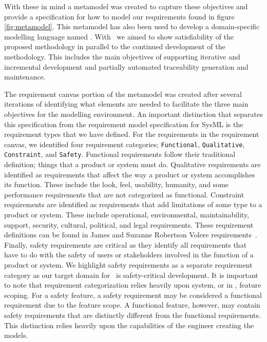 With these in mind a metamodel was created to capture these objectives and provide a specification for how to model our requirements found in figure \ref{fig:metamodel}. This metamodel has also been used to develop a domain-specific modelling language named \tool. With \tool\ we aimed to show satisfiability of the proposed methodology in parallel to the continued development of the methodology. This includes the main objectives of supporting iterative and incremental development and partially automated traceability generation and maintenance.

The requirement canvas portion of the metamodel was created after several iterations of identifying what elements are needed to facilitate the three main objectives for the modelling environment. An important distinction that separates this specification from the requirement model specification for SysML is the requirement types that we have defined. For the requirements in the requirement canvas, we identified four requirement categories; \texttt{Functional}, \texttt{Qualitative}, \texttt{Constraint}, and \texttt{Safety}. Functional requirements follow their traditional definition; things that a product or system must do. Qualitative requirements are identified as requirements that affect the way a product or system accomplishes its function. These include the look, feel, usability, humanity, and some performance requirements that are not categorized as functional. Constraint requirements are identified as requirements that add limitations of some type to a product or system. These include operational, environmental, maintainability, support, security, cultural, political, and legal requirements. These requirement definitions can be found in James and Suzanne Robertson Volere requirements~\cite{robertson2000volere}. Finally, safety requirements are critical as they identify all requirements that have to do with the safety of users or stakeholders involved in the function of a product or system. We highlight safety requirements as a separate requirement category as our target domain for \tool\ is safety-critical development. It is important to note that requirement categorization relies heavily upon system, or in \tool, feature scoping. For a safety feature, a safety requirement may be considered a functional requirement due to the feature scope. A functional feature, however, may contain safety requirements that are distinctly different from the functional requirements. This distinction relies heavily upon the capabilities of the engineer creating the models.

